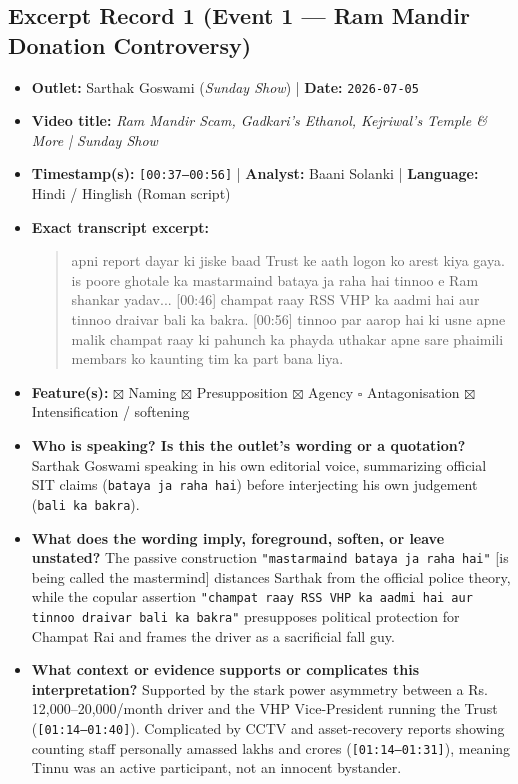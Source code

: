 \documentclass[10pt,a4paper]{article}
\begin{document}
\subsection*{Excerpt Record 1 (Event 1 --- Ram Mandir Donation Controversy)}
\begin{itemize}[leftmargin=1.5em, itemsep=3pt, topsep=4pt]
  \item \textbf{Outlet:} Sarthak Goswami (\textit{Sunday Show}) | \textbf{Date:} \texttt{2026-07-05}
  \item \textbf{Video title:} \textit{Ram Mandir Scam, Gadkari's Ethanol, Kejriwal's Temple \& More | Sunday Show}
  \item \textbf{Timestamp(s):} \texttt{[00:37--00:56]} | \textbf{Analyst:} Baani Solanki | \textbf{Language:} Hindi / Hinglish (Roman script)
  \item \textbf{Exact transcript excerpt:}
    \begin{quote}\small\ttfamily [00:37] apni report dayar ki jiske baad Trust ke aath logon ko arest kiya gaya. is poore ghotale ka mastarmaind bataya ja raha hai tinnoo e Ram shankar yadav... [00:46] champat raay RSS VHP ka aadmi hai aur tinnoo draivar bali ka bakra. [00:56] tinnoo par aarop hai ki usne apne malik champat raay ki pahunch ka phayda uthakar apne sare phaimili membars ko kaunting tim ka part bana liya.\end{quote}
  \item \textbf{Feature(s):} $\boxtimes$ Naming $\boxtimes$ Presupposition $\boxtimes$ Agency $\square$ Antagonisation $\boxtimes$ Intensification / softening
  \item \textbf{Who is speaking? Is this the outlet's wording or a quotation?} Sarthak Goswami speaking in his own editorial voice, summarizing official SIT claims (\texttt{bataya ja raha hai}) before interjecting his own judgement (\texttt{bali ka bakra}).
  \item \textbf{What does the wording imply, foreground, soften, or leave unstated?} The passive construction \texttt{"mastarmaind bataya ja raha hai"} [is being called the mastermind] distances Sarthak from the official police theory, while the copular assertion \texttt{"champat raay RSS VHP ka aadmi hai aur tinnoo draivar bali ka bakra"} presupposes political protection for Champat Rai and frames the driver as a sacrificial fall guy.
  \item \textbf{What context or evidence supports or complicates this interpretation?} Supported by the stark power asymmetry between a Rs.\,12,000--20,000/month driver and the VHP Vice-President running the Trust (\texttt{[01:14--01:40]}). Complicated by CCTV and asset-recovery reports showing counting staff personally amassed lakhs and crores (\texttt{[01:14--01:31]}), meaning Tinnu was an active participant, not an innocent bystander.

\end{itemize}
\end{document}
